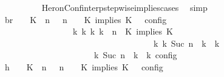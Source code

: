 \begin{isabellebody}
\ \ \ \ \ \ \ \ \isamarkupfalse%
\ HeronConf{\isacharunderscore}interp{\isacharunderscore}stepwise{\isacharunderscore}implies{\isacharunderscore}cases\ \isamarkupfalse%
\ simp\isanewline
\ \ \ \ \ \ \isamarkupfalse%
\ \isamarkupfalse%
\ br{}{\isacharcolon}\ {\isacartoucheopen}{\isasymrho}\ {\isasymin}\ {\isasymlbrakk}\ {\isacharparenleft}{\isacharparenleft}K\ {\isasymnot}{\isasymUp}\ n{\isacharparenright}\ {\isacharhash}\ {\isasymGamma}{\isacharparenright}{\isacharcomma}\ n\ {\isasymturnstile}\ {\isasymPsi}\ {\isasymtriangleright}\ {\isacharparenleft}{\isacharparenleft}K\ implies\ K\ {\isacharhash}\ {\isasymPhi}{\isacharparenright}\ {\isasymrbrakk}\isactrlsub c\isactrlsub o\isactrlsub n\isactrlsub f\isactrlsub i\isactrlsub g\isanewline
\ \ \ \ \ \ \ \ \ \ \ \ \ \ \ \ {\isasymLongrightarrow}\ {\isasymexists}{\isasymGamma}\isactrlsub k\ {\isasymPsi}\isactrlsub k\ {\isasymPhi}\isactrlsub k\ k{\isachardot}\ {\isacharparenleft}{\isacharparenleft}{\isasymGamma}{\isacharcomma}\ n\ {\isasymturnstile}\ {\isacharparenleft}{\isacharparenleft}K\ implies\ K\ {\isacharhash}\ {\isasymPsi}{\isacharparenright}\ {\isasymtriangleright}\ {\isasymPhi}{\isacharparenright}\isanewline
\ \ \ \ \ \ \ \ \ \ \ \ \ \ \ \ \ \ \ \ \ \ \ \ \ \ \ \ \ \ \ \ \ \ \ \ {\isasymhookrightarrow}\isactrlbsup k\isactrlesup \ {\isacharparenleft}{\isasymGamma}\isactrlsub k{\isacharcomma}\ Suc\ n\ {\isasymturnstile}\ {\isasymPsi}\isactrlsub k\ {\isasymtriangleright}\ {\isasymPhi}\isactrlsub k{\isacharparenright}{\isacharparenright}\isanewline
\ \ \ \ \ \ \ \ \ \ \ \ \ \ \ \ \ \ {\isasymand}\ {\isasymrho}\ {\isasymin}\ {\isasymlbrakk}\ {\isasymGamma}\isactrlsub k{\isacharcomma}\ Suc\ n\ {\isasymturnstile}\ {\isasymPsi}\isactrlsub k\ {\isasymtriangleright}\ {\isasymPhi}\isactrlsub k\ {\isasymrbrakk}\isactrlsub c\isactrlsub o\isactrlsub n\isactrlsub f\isactrlsub i\isactrlsub g{\isacartoucheclose}\isanewline
\ \ \ \ \ \ \isamarkupfalse%
\ {\isacharminus}\isanewline
\ \ \ \ \ \ \ \ \isamarkupfalse%
\ h{}{\isacharcolon}\ {\isacartoucheopen}{\isasymrho}\ {\isasymin}\ {\isasymlbrakk}\ {\isacharparenleft}{\isacharparenleft}K\ {\isasymnot}{\isasymUp}\ n{\isacharparenright}\ {\isacharhash}\ {\isasymGamma}{\isacharparenright}{\isacharcomma}\ n\ {\isasymturnstile}\ {\isasymPsi}\ {\isasymtriangleright}\ {\isacharparenleft}{\isacharparenleft}K\ implies\ K\ {\isacharhash}\ {\isasymPhi}{\isacharparenright}\ {\isasymrbrakk}\isactrlsub c\isactrlsub o\isactrlsub n\isactrlsub f\isactrlsub i\isactrlsub g{\isacartoucheclose}\isanewline

\end{isabellebody}
